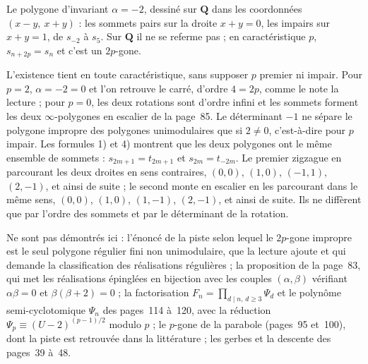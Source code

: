 Le polygone d'invariant $\alpha = -2$, dessiné sur $\mathbf Q$ dans les coordonnées $(x - y,\ x + y)$ : les sommets pairs sur la droite $x + y = 0$, les impairs sur $x + y = 1$, de $s_{-2}$ à $s_5$. Sur $\mathbf Q$ il ne se referme pas ; en caractéristique $p$, $s_{n + 2p} = s_n$ et c'est un $2p$-gone.
\begin{center}
\end{center}

\begin{remarque}
L'existence tient en toute caractéristique, sans supposer $p$ premier ni impair. Pour $p = 2$, $\alpha = -2 = 0$ et l'on retrouve le carré, d'ordre $4 = 2p$, comme le note la lecture ; pour $p = 0$, les deux rotations sont d'ordre infini et les sommets forment les deux $\infty$-polygones en escalier de la page~85. Le déterminant $-1$ ne sépare le polygone impropre des polygones unimodulaires que si $2 \neq 0$, c'est-à-dire pour $p$ impair. Les formules 1) et 4) montrent que les deux polygones ont le même ensemble de sommets : $s_{2m+1} = t_{2m+1}$ et $s_{2m} = t_{-2m}$. Le premier zigzague en parcourant les deux droites en sens contraires, $(0, 0)$, $(1, 0)$, $(-1, 1)$, $(2, -1)$, et ainsi de suite ; le second monte en escalier en les parcourant dans le même sens, $(0, 0)$, $(1, 0)$, $(1, -1)$, $(2, -1)$, et ainsi de suite. Ils ne diffèrent que par l'ordre des sommets et par le déterminant de la rotation.
\end{remarque}

Ne sont pas démontrés ici : l'énoncé de la piste selon lequel le $2p$-gone impropre est le seul polygone régulier fini non unimodulaire, que la lecture ajoute et qui demande la classification des réalisations régulières ; la proposition de la page~83, qui met les réalisations épinglées en bijection avec les couples $(\alpha, \beta)$ vérifiant $\alpha\beta = 0$ et $\beta(\beta + 2) = 0$ ; la factorisation $F_n = \prod_{d \mid n,\, d \geq 3} \Psi_d$ et le polynôme semi-cyclotomique $\Psi_n$ des pages~114 à~120, avec la réduction $\Psi_p \equiv (U - 2)^{(p-1)/2}$ modulo $p$ ; le $p$-gone de la parabole (pages~95 et~100), dont la piste est retrouvée dans la littérature ; les gerbes et la descente des pages~39 à~48.
